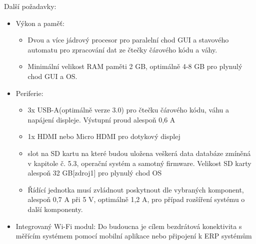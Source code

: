 Další požadavky:
\begin{itemize}
    \item Výkon a paměť: 
        \begin{itemize}
            \item Dvou a více jádrový procesor pro paralelní chod GUI a stavového automatu pro zpracování dat ze čtečky čárového kódu a váhy. 
            \item Minimální velikost RAM paměti 2 GB, optimálně 4-8 GB pro plynulý chod GUI a OS.
        \end{itemize}
    \item Periferie:
        \begin{itemize}
            \item 3x USB-A(optimálně verze 3.0) pro čtečku čárového kódu, váhu a napájení displeje. Výstupní proud alespoň 0,6 A 
            \item 1x HDMI nebo Micro HDMI pro dotykový displej
            \item slot na SD kartu na které budou uložena veškerá data databáze zmíněná v kapitole č. 5.3, operační systém a samotný firmware. Velikost SD karty alespoň 32 GB[zdroj1] pro plynulý chod OS  
            \item Řídící jednotka musí zvládnout poskytnout dle vybraných komponent, alespoň 0,7 A při 5 V, optimálně 1,2 A, pro případ rozšíření systému o další komponenty.
        \end{itemize}
    \item Integrovaný Wi-Fi modul: Do budoucna je cílem bezdrátová konektivita s měřícím systémem pomocí mobilní aplikace nebo připojení k ERP systémům
\end{itemize}


